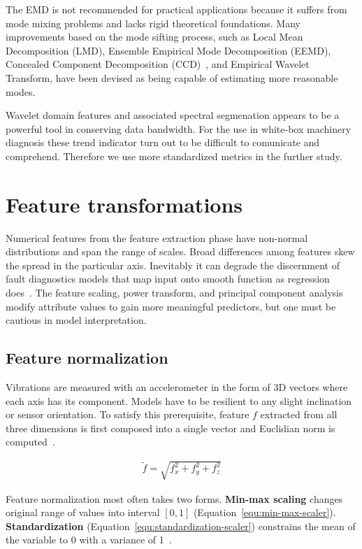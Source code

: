 The EMD is not recommended for practical applications because it suffers from mode mixing problems and lacks rigid theoretical foundations. Many improvements based on the mode sifting process, such as Local Mean Decomposition (LMD), Ensemble Empirical Mode Decomposition (EEMD), Concealed Component Decomposition (CCD)~\cite{tiwari_novel_2021}, and Empirical Wavelet Transform, have been devised as being capable of estimating more reasonable modes.

Wavelet domain features and associated spectral segmenation appears to be a powerful tool in conserving data bandwidth. For the use in white-box machinery diagnosis these trend indicator turn out to be difficult to comunicate and comprehend. Therefore we use more standardized metrics in the further study.

\section{Feature transformations}
Numerical features from the feature extraction phase have non-normal distributions and span the range of scales. Broad differences among features skew the spread in the particular axis. Inevitably it can degrade the discernment of fault diagnostics models that map input onto smooth function as regression does~\cite{zheng_feature_2018}. The feature scaling, power transform, and principal component analysis modify attribute values to gain more meaningful predictors, but one must be cautious in model interpretation.

\subsection{Feature normalization}
Vibrations are measured with an accelerometer in the form of 3D vectors where each axis has its component. Models have to be resilient to any slight inclination or sensor orientation. To satisfy this prerequisite, feature $f$ extracted from all three dimensions is first composed into a single vector and Euclidian norm is computed~\cite{kamminga_robust_2018}.

\begin{ceqn}\begin{align}
\widetilde{f} = \sqrt{f_x^2 + f_y^2 + f_z^2}
\label{equ:min-max-scaler}
\end{align}\end{ceqn}

Feature normalization most often takes two forms. \textbf{Min-max scaling} changes original range of values into interval $[0, 1]$ (Equation~\ref{equ:min-max-scaler}). \textbf{Standardization} (Equation~\ref{equ:standardization-scaler}) constrains the mean of the variable to 0 with a variance of 1~\cite{zheng_feature_2018}.

